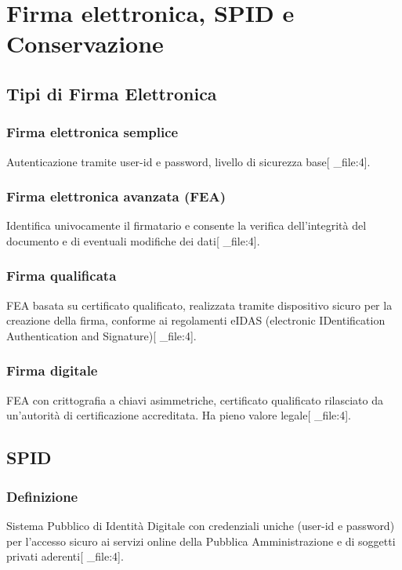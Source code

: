 \documentclass[12pt,a4paper]{article}
\begin{document}
\section{Firma elettronica, SPID e Conservazione}

\subsection{Tipi di Firma Elettronica}

\subsubsection{Firma elettronica semplice}
Autenticazione tramite user-id e password, livello di sicurezza base[ _file:4].

\subsubsection{Firma elettronica avanzata (FEA)}
Identifica univocamente il firmatario e consente la verifica dell'integrità del documento e di eventuali modifiche dei dati[ _file:4].

\subsubsection{Firma qualificata}
FEA basata su certificato qualificato, realizzata tramite dispositivo sicuro per la creazione della firma, conforme ai regolamenti eIDAS (electronic IDentification Authentication and Signature)[ _file:4].

\subsubsection{Firma digitale}
FEA con crittografia a chiavi asimmetriche, certificato qualificato rilasciato da un'autorità di certificazione accreditata. Ha pieno valore legale[ _file:4].

\subsection{SPID}

\subsubsection{Definizione}
Sistema Pubblico di Identità Digitale con credenziali uniche (user-id e password) per l'accesso sicuro ai servizi online della Pubblica Amministrazione e di soggetti privati aderenti[ _file:4].
\end{document}
